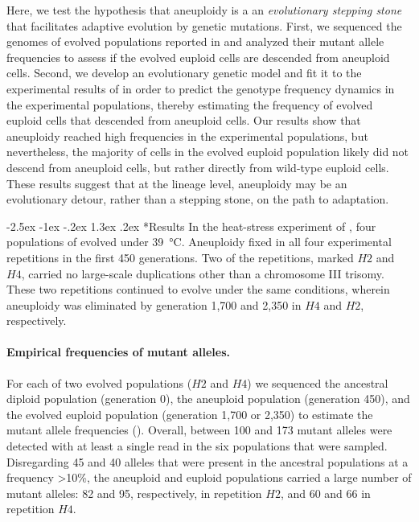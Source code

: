 \documentclass[12pt]{extarticle}
\makeatletter
\renewcommand\section{\@startsection {section}{1}{\z@}%
     {-2.5ex \@plus -1ex \@minus -.2ex}%
     {1.3ex \@plus.2ex}%
    {\Large\bfseries}}
\makeatother
\begin{document}
Here, we test the hypothesis that aneuploidy is a an \emph{evolutionary stepping stone} that facilitates adaptive evolution by genetic mutations.
First, we sequenced the genomes of evolved populations reported in \citep{Yona2012} and analyzed their mutant allele frequencies to assess if the evolved euploid cells are descended from aneuploid cells.
Second, we develop an evolutionary genetic model and fit it to the experimental results of \citet{Yona2012} in order to predict the genotype frequency dynamics in the experimental populations, thereby estimating the frequency of evolved euploid cells that descended from aneuploid cells. 
Our results show that aneuploidy reached high frequencies in the experimental populations, but nevertheless, the majority of cells in the evolved euploid population likely did not descend from aneuploid cells, but rather directly from wild-type euploid cells.
These results suggest that at the lineage level, aneuploidy may be an evolutionary detour, rather than a stepping stone, on the path to adaptation.


\section*{Results}
In the heat-stress experiment of \citet{Yona2012}, four populations of \yeast evolved under \SI{39}{\celsius}.
Aneuploidy fixed in all four experimental repetitions in the first 450 generations.
Two of the repetitions, marked $H2$ and $H4$, carried no large-scale duplications other than a chromosome III trisomy.
These two repetitions continued to evolve under the same conditions, wherein aneuploidy was eliminated by generation 1,700 and 2,350 in $H4$ and $H2$, respectively.

\paragraph{Empirical frequencies of mutant alleles.} 
For each of two evolved populations ($H2$ and $H4$) we sequenced the ancestral diploid population (generation 0), the aneuploid population (generation 450), and the evolved euploid population (generation 1,700 or 2,350) to estimate the mutant allele frequencies (). 
Overall, between 100 and 173 mutant alleles were detected with at least a single read in the six populations that were sampled. 
Disregarding 45 and 40 alleles that were present in the ancestral populations at a frequency >10\%, the aneuploid and euploid populations carried a large number of mutant alleles: 82 and 95, respectively, in repetition $H2$, and 60 and 66 in repetition $H4$.
\end{document}

